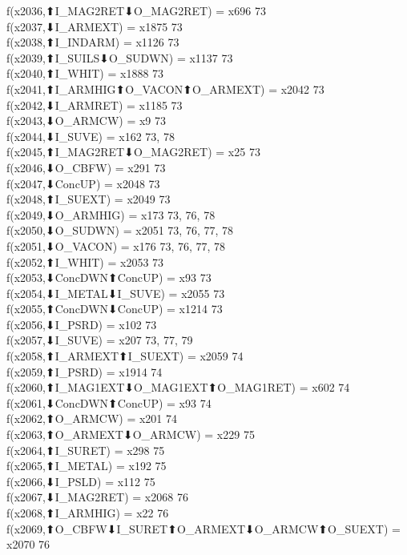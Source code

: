 f(x2036,⬆I_MAG2RET⬇O_MAG2RET) = x696 {73} \\
f(x2037,⬇I_ARMEXT) = x1875 {73} \\
f(x2038,⬆I_INDARM) = x1126 {73} \\
f(x2039,⬆I_SUILS⬇O_SUDWN) = x1137 {73} \\
f(x2040,⬆I_WHIT) = x1888 {73} \\
f(x2041,⬆I_ARMHIG⬆O_VACON⬆O_ARMEXT) = x2042 {73} \\
f(x2042,⬇I_ARMRET) = x1185 {73} \\
f(x2043,⬇O_ARMCW) = x9 {73} \\
f(x2044,⬇I_SUVE) = x162 {73, 78} \\
f(x2045,⬆I_MAG2RET⬇O_MAG2RET) = x25 {73} \\
f(x2046,⬇O_CBFW) = x291 {73} \\
f(x2047,⬇ConcUP) = x2048 {73} \\
f(x2048,⬆I_SUEXT) = x2049 {73} \\
f(x2049,⬇O_ARMHIG) = x173 {73, 76, 78} \\
f(x2050,⬇O_SUDWN) = x2051 {73, 76, 77, 78} \\
f(x2051,⬇O_VACON) = x176 {73, 76, 77, 78} \\
f(x2052,⬆I_WHIT) = x2053 {73} \\
f(x2053,⬇ConcDWN⬆ConcUP) = x93 {73} \\
f(x2054,⬇I_METAL⬇I_SUVE) = x2055 {73} \\
f(x2055,⬆ConcDWN⬇ConcUP) = x1214 {73} \\
f(x2056,⬇I_PSRD) = x102 {73} \\
f(x2057,⬇I_SUVE) = x207 {73, 77, 79} \\
f(x2058,⬆I_ARMEXT⬆I_SUEXT) = x2059 {74} \\
f(x2059,⬆I_PSRD) = x1914 {74} \\
f(x2060,⬆I_MAG1EXT⬇O_MAG1EXT⬆O_MAG1RET) = x602 {74} \\
f(x2061,⬇ConcDWN⬆ConcUP) = x93 {74} \\
f(x2062,⬆O_ARMCW) = x201 {74} \\
f(x2063,⬆O_ARMEXT⬇O_ARMCW) = x229 {75} \\
f(x2064,⬆I_SURET) = x298 {75} \\
f(x2065,⬆I_METAL) = x192 {75} \\
f(x2066,⬇I_PSLD) = x112 {75} \\
f(x2067,⬇I_MAG2RET) = x2068 {76} \\
f(x2068,⬆I_ARMHIG) = x22 {76} \\
f(x2069,⬆O_CBFW⬇I_SURET⬆O_ARMEXT⬇O_ARMCW⬆O_SUEXT) = x2070 {76} \\

